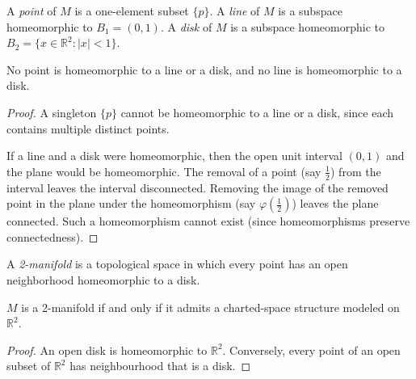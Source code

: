     \begin{definition}\label{def:point-line-disk}
      \leanok
      A \emph{point} of $M$ is a one-element subset $\{ p \}$.
      A \emph{line} of $M$ is a subspace homeomorphic to $B_1 = (0, 1)$.
      A \emph{disk} of $M$ is a subspace homeomorphic to $B_2 = \{ x \in
      \mathbb{R}^2 : |x| < 1 \}$.
    \end{definition}

    \begin{lemma}\label{lem:shapes-not-homeomorphic}
      \leanok
      No point is homeomorphic to a line or a disk, and no line is homeomorphic
      to a disk.
    \end{lemma}
    \begin{proof}
      \leanok
      A singleton $\{ p \}$ cannot be homeomorphic to a line or a disk, since
      each contains multiple distinct points.

      If a line and a disk were homeomorphic, then the open unit interval
      $(0, 1)$ and the plane would be homeomorphic. The removal of a point (say
      $\frac{1}{2}$) from the interval leaves the interval disconnected.
      Removing the image of the removed point in the plane under the
      homeomorphism (say $\varphi \left( \frac{1}{2} \right)$) leaves the plane
      connected. Such a homeomorphism cannot exist (since homeomorphisms
      preserve connectedness).
    \end{proof}

    \begin{definition}[2-manifold]\label{def:manifold}
      \leanok
      A \emph{2-manifold} is a topological space in which every point has an
      open neighborhood homeomorphic to a disk.
    \end{definition}

    \begin{lemma}\label{lem:manifold-charted}

      $M$ is a 2-manifold if and only if it admits a charted-space structure
      modeled on $\mathbb{R}^2$.
    \end{lemma}
    \begin{proof}

      An open disk is homeomorphic to $\mathbb{R}^2$. Conversely, every point
      of an open subset of $\mathbb{R}^2$ has neighbourhood that is a disk.
    \end{proof}

